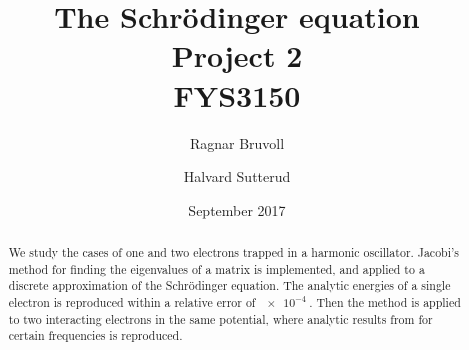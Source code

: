 \documentclass[10pt]{article}
\begin{document}
\title{The Schrödinger equation
\\ Project 2
\\ FYS3150}
\author{Ragnar Bruvoll \and Halvard Sutterud}
\date{September 2017}
\maketitle{\begin{center}\end{center}}
\thispagestyle{empty}

\begin{abstract}
    We study the cases of one and two electrons trapped in a harmonic
    oscillator. Jacobi's method for finding the eigenvalues of a matrix is
    implemented, and applied to a discrete approximation of the
    Schr\"{o}dinger equation. The analytic energies of a single electron 
    is reproduced within a relative error of $\SI{e-4}{}$. Then the method
    is applied to two interacting electrons in the same potential, where
    analytic results from \cite{PhysRevA.48.3561} for certain
    frequencies is reproduced.

\end{abstract}

\tableofcontents

\newpage
{}
\end{document}
